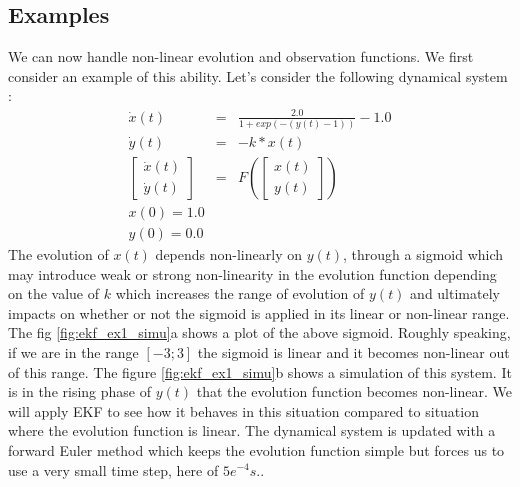 \documentclass[10pt,oneside]{scrartcl}
\begin{document}
\subsection{Examples}

We can now handle non-linear evolution and observation functions. We
first consider an example of this ability. Let's consider the following dynamical system :
\begin{eqnarray}
\dot{x}(t) &=& \frac{2.0}{1 + exp(-(y(t)-1))} -1.0\\
\dot{y}(t) &=& -k*x(t)\\
\begin{bmatrix}
\dot{x}(t) \\
\dot{y}(t)
\end{bmatrix} &=& F(\begin{bmatrix}
x(t) \\
y(t)
\end{bmatrix}) \\
x(0) = 1.0 \\
y(0) = 0.0 
\end{eqnarray}
The evolution of $x(t)$ depends non-linearly on $y(t)$, through a
sigmoid which may introduce weak or strong non-linearity in the
evolution function depending on the value of $k$ which increases the
range of evolution of $y(t)$ and ultimately impacts on whether or not
the sigmoid is applied in its linear or non-linear range. The fig
\ref{fig:ekf_ex1_simu}a shows a plot of the above sigmoid. Roughly
speaking, if we are in the range $[-3;3]$ the sigmoid is linear and it
becomes non-linear out of this range. The figure \ref{fig:ekf_ex1_simu}b shows a simulation of this system. It is in
the rising phase of $y(t)$ that the evolution function becomes
non-linear. We will apply EKF to see how it behaves in this situation
compared to situation where the evolution function is linear. The
dynamical system is updated with a forward Euler method which keeps
the evolution function simple but forces us to use a very small time
step, here of $5e^{-4} s.$.\\

\end{document}
